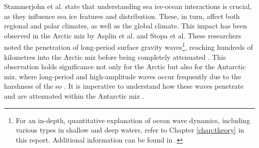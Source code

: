 
Stammerjohn et al. \cite{Stammerjohn2012} state that understanding sea ice-ocean interactions is crucial, as they influence sea ice features and distribution. These, in turn, affect both regional and polar climates, as well as the global climate. This impact has been observed in the Arctic \acs{miz} by Asplin et al. \cite{Asplin2012} and Stopa et al. \cite{Stopa2018} These researchers noted the penetration of long-period surface gravity waves\footnote{For an in-depth, quantitative explanation of ocean wave dynamics, including various types in shallow and deep waters, refer to Chapter \ref{chap:theory} in this report. Additional information can be found in \cite{Holthuijsen2007}.}, reaching hundreds of kilometres into the Arctic \acs{miz} before being completely attenuated \cite{Asplin2012,Stopa2018}. This observation holds significance not only for the Arctic but also for the Antarctic \acs{miz}, where long-period and high-amplitude waves occur frequently due to the harshness of the \acs{so} \cite{Young2020}. It is imperative to understand how these waves penetrate and are attenuated within the Antarctic \acs{miz} \cite{Alberello2021}.

